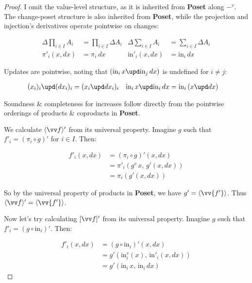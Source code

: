 \documentclass[]{rntz}
\newcommand\cat\textbf
\newcommand\Poset{\cat{Poset}}
\newcommand\D\Delta
\newcommand\injc{\mathrm{in}}
\newcommand\inj[1]{\injc_{#1}\,}
\newcommand\vals[1]{#1^v} %
\newcommand\valfn{\ensuremath{\vals{-}}}
\newcommand\chgs[1]{\D{#1}}
\newcommand\fork[1]{\langle{#1}\rangle}
\newcommand\krof[1]{[{#1}]}
\newcommand\funct[1]{\vals{#1}}
\newcommand\deriv[1]{#1'}
\begin{document}
\begin{proof}
  I omit the value-level structure, as it is inherited from \Poset{} along
  \valfn{}. The change-poset structure is also inherited from \Poset{}, while
  the projection and injection's derivatives operate pointwise on changes:

  \begin{align*}
    \chgs{\prod_{i \in I} A_i} &= \prod_{i \in I} \chgs A_i &
    \chgs{\sum_{i \in I} A_i} &= \sum_{i \in I} \chgs A_i
    \\
    \deriv\pi_i(x,dx) &= \pi_i~dx & \deriv\injc_i(x,dx) &= \inj i dx
  \end{align*}

  \noindent Updates are pointwise, noting that $(\inj i x \upd \inj j dx)$ is
  undefined for $i \ne j$:

  \begin{align*}
    (x_i)_i \upd (dx_i)_i &= (x_i \upd dx_i)_i &
    \inj i x \upd \inj i dx &= \inj i (x \upd dx)
  \end{align*}

  \noindent
  Soundness \& completeness for increases follow directly from the pointwise
  orderings of products \& coproducts in \Poset{}.

  We calculate $\deriv{\fork{\vv f}}$ from its universal property. Imagine $g$
  such that $\deriv f_i = (\pi_i \circ g)'$ for $i \in I$. Then:

  \begin{align*}
    \deriv f_i(x,dx) &= \deriv{(\pi_i \circ g)} (x,dx)\\
    &= \deriv\pi_i(\funct g\,x,\, \deriv g(x,dx))\\
    &= \pi_i (\deriv g(x,dx))
  \end{align*}

  \noindent
  So by the universal property of products in \Poset{}, we have $\deriv g =
  \fork{\vv{\deriv f}}$. Thus $\deriv{\fork{\vv f}} = \fork{\vv{\deriv f}}$.

  Now let's try calculating $\deriv{\krof{\vv f}}$ from its universal property.
  Imagine $g$ such that $\deriv f_i = \deriv{(g \circ \injc_i)}$. Then:

  \begin{align*}
    \deriv f_i(x,dx) &= \deriv{(g \circ \injc_i)}(x,dx)\\
    &= \deriv g(\funct\injc_i(x),\, \deriv\injc_i(x,dx))\\
    &= \deriv g(\inj i x,\, \inj i dx)
  \end{align*}


\end{proof}
\end{document}

